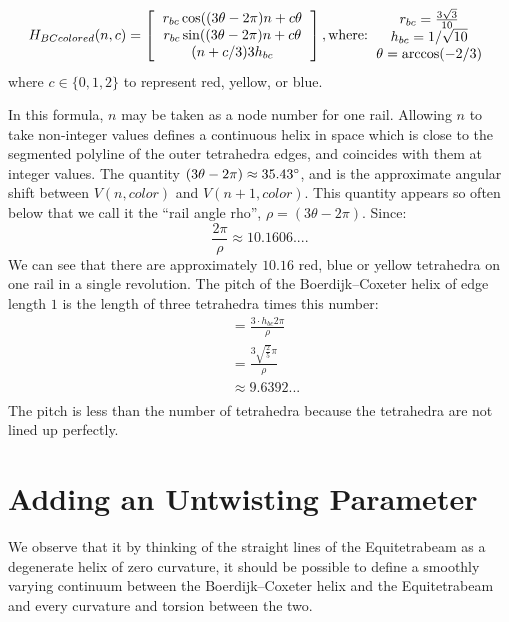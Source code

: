 \documentclass[11pt]{article}
\begin{document}
\[
H_{BCcolored}(n,c) =
\left [
  \begin{tabular}{c}
   $ r_{bc}  \cos((3 \theta - 2 \pi)n + c  \theta $\\
   $ r_{bc} \sin((3 \theta - 2 \pi)n + c  \theta $\\
   $ (n + c/3) 3  h_{bc} $
  \end{tabular}
  \right ],
\text{where:}
  \begin{tabular}{c}
 $ r_{bc} = \frac{3\sqrt{3}}{10} $\\
 $ h_{bc} = 1/\sqrt{10} $ \\
 $ \theta = \arccos(-2/3) $ \\
  \end{tabular}      
\]
where $c \in \{0,1,2\}$ to represent red, yellow, or blue.

In this formula, $n$ may be taken as a node number for one rail. Allowing $n$ to take non-integer values defines a continuous
helix in space which is close to the segmented polyline of the outer tetrahedra edges, and coincides with them at integer
values.
The quantity $ (3 \theta - 2 \pi) \approx 35.43 \degree $, and is the approximate angular shift between $V(n,color)$ and
$V(n+1,color)$. This quantity appears so often below that we call it the ``rail angle rho'', $\rho = (3 \theta - 2 \pi)$.
Since:
\[ \frac{2 \pi}{\rho} \approx 10.1606....
\]
We can see that there are approximately $10.16$ red, blue or yellow tetrahedra on one rail in a single revolution.
The pitch of the Boerdijk--Coxeter helix of edge length $1$ is the length of three tetrahedra times this number:
\begin{align*}
  &= \frac{3 \cdot h_{bc} 2 \pi }{\rho} \\
  &= \frac{3  \sqrt{\frac{2}{5}}  \pi}{\rho} \\
  &\approx 9.6392... \\
\end{align*}
The pitch is less than the number of tetrahedra because the tetrahedra are not lined up perfectly.

\section{Adding an Untwisting Parameter}

We observe that it by thinking of the straight lines of the Equitetrabeam as a degenerate helix of zero curvature,
it should be possible to define a smoothly varying continuum between the Boerdijk--Coxeter helix and the Equitetrabeam and every
curvature and torsion between the two.
\end{document}
